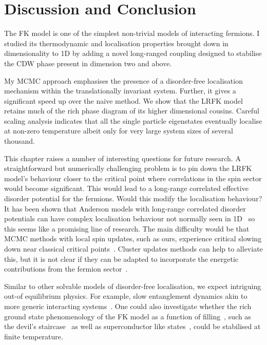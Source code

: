 \hypertarget{fk-conclusion}{%
\section{Discussion and Conclusion}\label{fk-conclusion}}

The FK model is one of the simplest non-trivial models of interacting fermions. I studied its thermodynamic and localisation properties brought down in dimensionality to 1D by adding a novel long-ranged coupling designed to stabilise the CDW phase present in dimension two and above.

My MCMC approach emphasises the presence of a disorder-free localisation mechanism within the translationally invariant system. Further, it gives a significant speed up over the naive method. We show that the LRFK model retains much of the rich phase diagram of its higher dimensional cousins. Careful scaling analysis indicates that all the single particle eigenstates eventually localise at non-zero temperature albeit only for very large system sizes of several thousand.

This chapter raises a number of interesting questions for future research. A straightforward but numerically challenging problem is to pin down the LRFK model's behaviour closer to the critical point where correlations in the spin sector would become significant. This would lead to a long-range correlated effective disorder potential for the fermions. Would this modify the localisation behaviour? It has been shown that Anderson models with long-range correlated disorder potentials can have complex localisation behaviour not normally seen in 1D~\autocite{aubryAnalyticityBreakingAnderson1980,shimasakiAnomalousLocalizationMultifractality2022} so this seems like a promising line of research. The main difficulty would be that MCMC methods with local spin updates, such as ours, experience critical slowing down near classical critical points~\autocite{geyerPracticalMarkovChain1992,levinMarkovChainsMixing2017,vatsMultivariateOutputAnalysis2015}. Cluster updates methods can help to alleviate this, but it is not clear if they can be adapted to incorporate the energetic contributions from the fermion sector~\autocite{evertzClusterAlgorithmVertex1993,fukuiOrderNClusterMonte2009,wolffCollectiveMonteCarlo1989}.

Similar to other solvable models of disorder-free localisation, we expect intriguing out-of equilibrium physics. For example, slow entanglement dynamics akin to more generic interacting systems~\autocite{hartLogarithmicEntanglementGrowth2021}. One could also investigate whether the rich ground state phenomenology of the FK model as a function of filling~\autocite{gruberGroundStatesSpinless1990}, such as the devil's staircase~\autocite{michelettiCompleteDevilStaircase1997} as well as superconductor like states~\autocite{caiVisualizingEvolutionMott2016}, could be stabilised at finite temperature.

